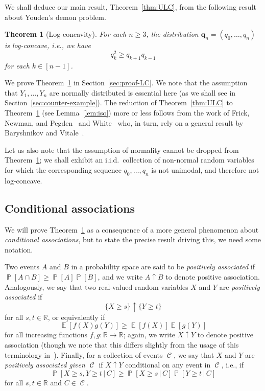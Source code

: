 \documentclass[12pt,english,reqno]{amsart}
\theoremstyle{plain}
\newtheorem{thm}{Theorem}[section]
\theoremstyle{remark}
\numberwithin{figure}{section}
\numberwithin{equation}{section}
\def\rr{\mathbb{R}}
\DeclareMathOperator{\Eb}{\mathbb{E}} %
\DeclareMathOperator{\Pb}{\mathbb{P}} %
\DeclareMathOperator{\cC}{\mathcal{C}} %
\def\aq{q} %
\newcommand{\darkblue}{\color{darkblue}}
\newcommand{\defnb}[1]{\emph{\darkblue #1}}
\begin{document}
We shall deduce our main result, Theorem~\ref{thm:ULC}, from the following result about Youden's demon problem.
\begin{thm}[Log-concavity]\label{thm:LC}
	For each $n\ge 3$, the distribution $\mathbf{q}_n = (q_0,\dots, q_n)$ is log-concave, i.e., we have
	\begin{equation}\label{eq:LC}
		\aq_{k}^2 \geq \aq_{k+1} \aq_{k-1}
	\end{equation}
	for each $k \in [n-1]$.
\end{thm}

We prove Theorem~\ref{thm:LC} in Section~\ref{sec:proof-LC}.
We note that the assumption that $Y_1,\ldots, Y_n$ are normally distributed is essential here (as we shall see in Section~\ref{sec:counter-example}).
The reduction of Theorem~\ref{thm:ULC} to Theorem~\ref{thm:LC} (see Lemma~\ref{lem:iso}) more or less follows from the work of Frick, Newman, and Pegden~\citep{FNP25} and White~\citep{White} who, in turn, rely on a general result by Baryshnikov and Vitale~\citep{BV97}.

Let us also note that the assumption of normality cannot be dropped from Theorem~\ref{thm:LC}; we shall exhibit an i.i.d.\ collection of non-normal random variables for which the corresponding sequence $\aq_0,\dots, \aq_n$ is not unimodal, and therefore not log-concave.

\subsection*{Conditional associations}
We will prove Theorem~\ref{thm:LC} as a consequence of a more general phenomenon about \defnb{conditional associations}, but to state the precise result driving this, we need some notation.

Two events $A$ and $B$ in a probability space are said to be \defnb{positively associated} if $\Pb[A \cap B] \geq \Pb[A] \Pb[B]$, and we write $A \uparrow B$ to denote positive association. Analogously, we say that two real-valued random variables $X$ and $Y$ are \defnb{positively associated} if
\[
	\{X \geq s \} \uparrow \{Y \geq t \}
\]
for all $s,t \in \rr$, or equivalently if
\[
	\Eb[f(X) g(Y)] \geq \Eb[f(X)] \Eb[g(Y)]
\]
for all increasing functions $f,g: \rr \to \rr$; again, we write $X \uparrow Y$ to denote positive association (though we note that this differs slightly from the usage of this terminology in~\citep{KN}). Finally, for a collection of events $\cC$, we say that $X$ and $Y$ are \defnb{positively associated given $\cC$} if $X \uparrow Y$ conditional on any event in $\cC$, i.e., if
\[ \Pb \left[ X \geq s, Y \geq t \, \vert\, C \right ] \geq \Pb \left[ X \geq s \, \vert \, C \right ] \Pb \left[ Y \geq t \, \vert \, C \right ]\]
for all $s,t \in \rr$ and $C \in \cC$.
\end{document}
